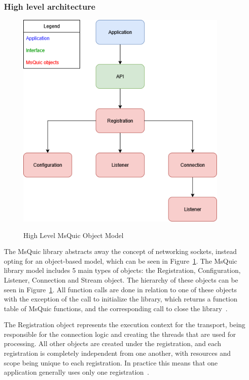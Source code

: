 \documentclass[english, 12pt, a4paper, elec, utf8, a-2b, online]{aaltothesis}
\begin{document}
\subsubsection{High level architecture}

\begin{figure}[h]
	\centering
	\includegraphics[alt={Block diagram of the high level object model of the MsQuic library, including relationships}, height=11cm]{./images/msquic_architecture.png}
	\caption{High Level MsQuic Object Model}
	\label{fig:msquic_arch}
\end{figure}

The MsQuic library abstracts away the concept of networking sockets, instead opting
for an object-based model, which can be seen in Figure~\ref{fig:msquic_arch}. The
MsQuic library model includes 5 main types of objects: the Registration, Configuration,
Listener, Connection and Stream object. The hierarchy of these objects can be seen
in Figure~\ref{fig:msquic_arch}. All function calls are done in relation to one of
these objects with the exception of the call to initialize the library, which returns
a function table of MsQuic functions, and the corresponding call to close the library~\cite{msquic_docs}.

The Registration object represents the execution context for the transport, being
responsible for the connection logic and creating the threads that are used for
processing. All other objects are created under the registration, and each registration
is completely independent from one another, with resources and scope being
unique to each registration. In practice this means that one application generally
uses only one registration~\cite{msquic_docs}.
\end{document}
